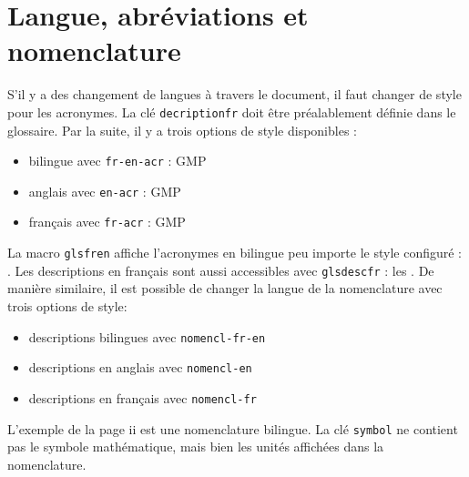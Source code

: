 \documentclass[PhD,nohyperref,english,french]{ulthese}
\begin{document}
\section{Langue, abréviations et nomenclature}

S'il y a des changement de langues à travers le document, il faut changer de style pour les acronymes. La clé \texttt{decriptionfr} doit être préalablement définie dans le glossaire. Par la suite, il y a trois options de style disponibles : 
\begin{itemize}
 \item bilingue  avec \texttt{fr-en-acr}  : \acrfull{GMP}
 \item anglais avec \texttt{en-acr} : \acrfull{GMP}
  \item français avec \texttt{fr-acr} : \acrfull{GMP}
\end{itemize}
La macro \texttt{glsfren} affiche l'acronymes en bilingue peu importe le style configuré : . Les descriptions en français sont aussi accessibles avec \texttt{glsdescfr} : les . De manière similaire, il est possible de changer la langue de la nomenclature avec trois options de style:
\begin{itemize}
\item descriptions bilingues avec \texttt{nomencl-fr-en}
\item descriptions en anglais avec \texttt{nomencl-en}
\item descriptions en français avec \texttt{nomencl-fr}
\end{itemize}
L'exemple de la page ii est une nomenclature bilingue. La clé \texttt{symbol} ne contient pas le symbole mathématique, mais bien les unités affichées dans la nomenclature.
\end{document}

